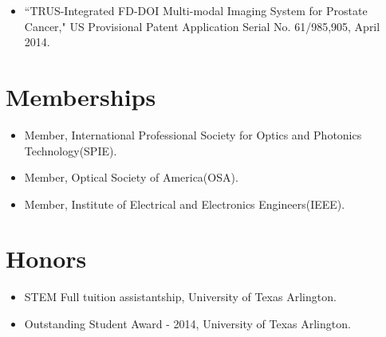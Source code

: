 \documentclass{my_cv}
\begin{document}
\vspace{-2mm} %
\begin{itemize} \itemsep -2pt %
\item ``TRUS-Integrated FD-DOI Multi-modal Imaging System for Prostate Cancer," US Provisional Patent Application Serial No. 61/985,905, April 2014. 
\end{itemize}



\vspace{-5mm} %


\section{{Memberships}} 

\vspace{-2mm} %

\begin{itemize} \itemsep -2pt 
\item Member, International Professional Society for Optics and Photonics Technology(SPIE).
\item Member, Optical Society of America(OSA). 
\item Member, Institute of Electrical and Electronics Engineers(IEEE). 
\end{itemize}


\vspace{-5mm} %


\section{{Honors}} 

\vspace{-5pt} %
\begin{itemize} \itemsep -2pt 
\item STEM Full tuition assistantship, University of Texas Arlington. \\
\item Outstanding Student Award - 2014, University of Texas Arlington. \\
\end{itemize}
\end{document}
